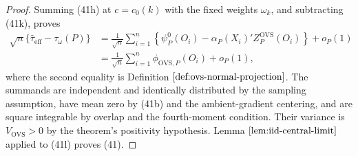 \documentclass{article}
\begin{document}
\begin{proof}
Summing (41h) at \(c=c_0(k)\) with the fixed weights \(\omega_k\), and subtracting (41k), proves
\[
\begin{aligned}
\sqrt n\{\widehat\tau_{\mathrm{eff}}-\tau_\omega(P)\}
&=\frac1{\sqrt n}\sum_{i=1}^n
\left\{\psi_P^0(O_i)-\alpha_P(X_i)'Z_P^{\mathrm{OVS}}(O_i)\right\}+o_P(1)\\
&=\frac1{\sqrt n}\sum_{i=1}^n\phi_{\mathrm{OVS},P}(O_i)+o_P(1),
\end{aligned}
\tag{41l}
\]
where the second equality is Definition \(\ref{def:ovs-normal-projection}\).  The summands are independent and identically distributed by the sampling assumption, have mean zero by (41b) and the ambient-gradient centering, and are square integrable by overlap and the fourth-moment condition.  Their variance is \(V_{\mathrm{OVS}}>0\) by the theorem's positivity hypothesis.  Lemma \(\ref{lem:iid-central-limit}\) applied to (41l) proves (41).


\end{proof}
\end{document}

